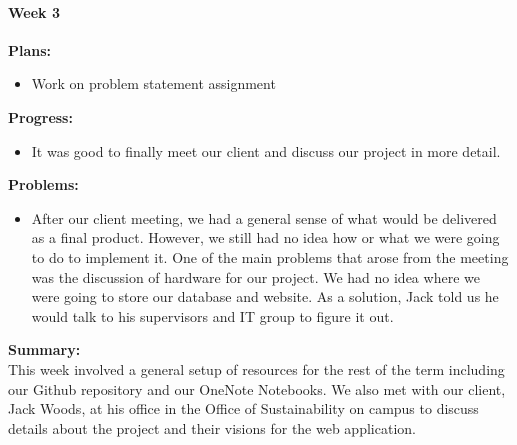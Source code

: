\paragraph{Week 3}
\begin{adjustwidth}{2.5em}{0pt}
    \vspace{-0.5cm}\textbf{Plans:}
    \vspace{-0.5cm}
    \begin{itemize}
        \item Work on problem statement assignment 
    \end{itemize} 
    \vspace{-0.3cm}\textbf{Progress:}
    \vspace{-0.5cm}
    \begin{itemize}
        \item It was good to finally meet our client and discuss our project in more detail.
    \end{itemize} 
    \vspace{-0.3cm}\textbf{Problems:}
    \vspace{-0.5cm}
    \begin{itemize}
        \item After our client meeting, we had a general sense of what would be delivered as a final product. However, we still had no idea how or what we were going to do to implement it. One of the main problems that arose from the meeting was the discussion of hardware for our project. We had no idea where we were going to store our database and website. As a solution, Jack told us he would talk to his supervisors and IT group to figure it out.
    \end{itemize}  
    \vspace{-0.3cm}\noindent\textbf{Summary:}\\
    \noindent This week involved a general setup of resources for the rest of the term including our Github repository and our OneNote Notebooks. We also met with our client, Jack Woods, at his office in the Office of Sustainability on campus to discuss details about the project and their visions for the web application.
	\end{adjustwidth} 
